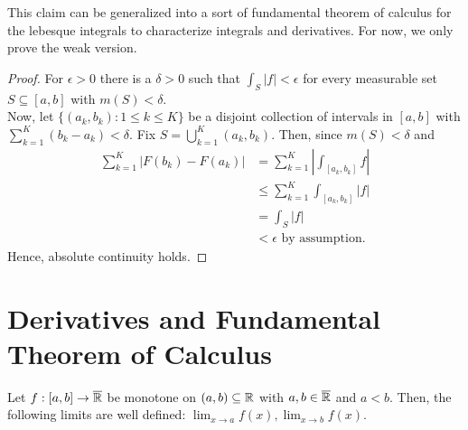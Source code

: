 This claim can be generalized into a sort of fundamental theorem of calculus for the lebesque integrals to characterize integrals and derivatives. For now, we only prove the weak version.
\begin{proof}
	For \(\epsilon > 0\) 	there is a \(\delta > 0\) such that \(\int _{S} \left| f \right| < \epsilon\) for every measurable set \(S \subseteq \left[ a, b \right] \) with \(m\left( S \right) < \delta\).\\
	Now, let \(\{\left( a_{k}, b_{k} \right) : 1 \le k \le K\} \) be a disjoint collection of intervals in \(\left[ a, b \right] \) with \(\sum_{k=1}^{K}\left( b_{k} - a_{k} \right) < \delta\). Fix \(S = \bigcup_{k=1} ^{K}\left( a_{k}, b_{k} \right) \). Then, since \(m\left( S \right)  < \delta\) and
	\begin{align*}
		\sum_{k=1}^{K} \left| F\left( b_{k} \right)  - F\left( a_{k} \right)  \right| &=  \sum_{k=1}^{K} \left| \int_{\left[ a_{k}, b_{k} \right] } f \right|  \\
											      &\le \sum_{k=1}^{K}  \int_{\left[ a_{k}, b_{k} \right] } \left| f \right| \\
											      &= \int_{S} \left| f \right|   \\
											      &< \epsilon \text{ by assumption}
	.\end{align*}
	Hence, absolute continuity holds.
\end{proof}
\section{Derivatives and Fundamental Theorem of Calculus}
\begin{proposition}
	Let \(f: \left[ a, b \right]  \to \overline{\mathbb{R}}\) be monotone on \(\left( a, b \right) \subseteq \mathbb{R}\) with \(a, b \in \overline{\mathbb{R}}\) and  \(a < b\). Then, the following limits are well defined: \(\lim_{x \to a} f\left( x \right) , \lim_{x \to b}f\left( x \right) \).
\end{proposition}
